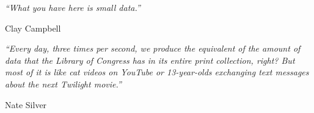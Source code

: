 \documentclass[SDSUThesis.tex]{subfiles}
\begin{document}
\newpage

\vspace*{\fill}

\begin{flushleft}
\textit{``What you have here is small data.''}
\end{flushleft}

\begin{flushright}
Clay Campbell
\end{flushright}

\vspace{1in}

\begin{flushleft}
\textit{``Every day, three times per second, we produce the equivalent of the amount of data that the Library of Congress has in its entire print collection, right? But most of it is like cat videos on YouTube or 13-year-olds exchanging text messages about the next Twilight movie.''}
\end{flushleft}

\begin{flushright}
Nate Silver
\end{flushright}
\end{document}
